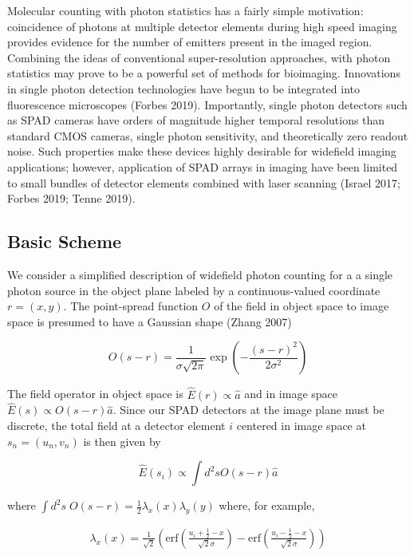 \documentclass[a4paper, twocolumn, superscriptaddress,prl]{revtex4}  %
\begin{document}
Molecular counting with photon statistics has a fairly simple motivation: coincidence of photons at multiple detector elements during high speed imaging provides evidence for the number of emitters present in the imaged region. Combining the ideas of conventional super-resolution approaches, with photon statistics may prove to be a powerful set of methods for bioimaging. Innovations in single photon detection technologies have begun to be integrated into fluorescence microscopes (Forbes 2019). Importantly, single photon detectors such as SPAD cameras have orders of magnitude higher temporal resolutions than standard CMOS cameras, single photon sensitivity, and theoretically zero readout noise. Such properties make these devices highly desirable for widefield imaging applications; however, application of SPAD arrays in imaging have been limited to small bundles of detector elements combined with laser scanning (Israel 2017; Forbes 2019; Tenne 2019).

\subsection{Basic Scheme}

We consider a simplified description of widefield photon counting for a a single photon source in the object plane labeled by a continuous-valued coordinate $r=(x,y)$. The point-spread function $O$ of the field in object space to image space is presumed to have a Gaussian shape (Zhang 2007)

\begin{equation}
O(s-r) = \frac{1}{\sigma\sqrt{2\pi}}\exp\left(-\frac{(s-r)^2}{2\sigma^2}\right)
\end{equation}

The field operator in object space is $\hat{E}(r) \propto \hat{a}$ and in image space $\hat{E}(s) \propto O(s-r)\hat{a}$. Since our SPAD detectors at the image plane must be discrete, the total field at a detector element $i$ centered in image space at $s_n=(u_n,v_n)$ is then given by

\begin{equation}
\hat{E}(s_i) \propto \int d^{2}s O(s-r)\hat{a}
\end{equation}

where $\int d^2 s \; O(s-r) = \frac{1}{2}\lambda_{x}(x) \lambda_{y}(y)$ where, for example,

\begin{align*}
\lambda_{x}(x) = \frac{1}{\sqrt{2}}\left(\mathrm{erf}\left(\frac{u_i+\frac{1}{2}-x}{\sqrt{2}\sigma}\right) -\mathrm{erf}\left(\frac{u_i-\frac{1}{2}-x}{\sqrt{2}\sigma}\right)\right)
\end{align*}
\end{document}
